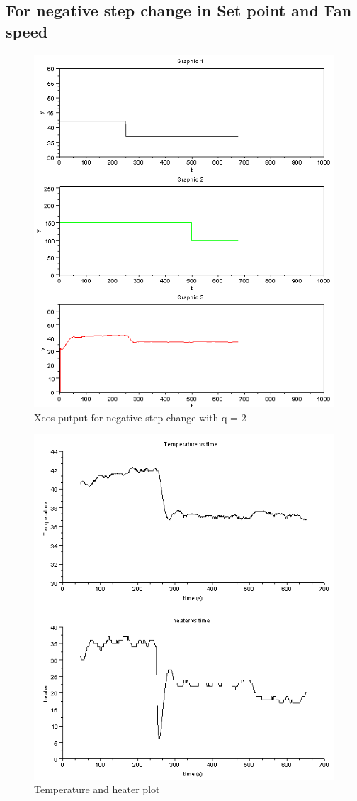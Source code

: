 \subsection{For negative step change in Set point and Fan speed}

\begin{figure}[H]
\centering
  \includegraphics[width=0.8\linewidth]{mpc/4_1.PNG}
  \caption{Xcos putput for negative step change with q = 2}
\end{figure}
\begin{figure}[H]
\centering
  \includegraphics[width=0.8\linewidth]{mpc/4_1_heater_final.png}
  \caption{Temperature and heater plot}
\end{figure}


